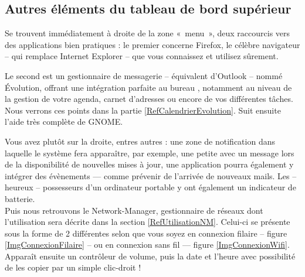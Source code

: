 \subsection{Autres éléments du tableau de bord supérieur}
\IconeBarreHaut
Se trouvent immédiatement à droite de la zone «~menu~», deux raccourcis vers des applications bien pratiques : le premier concerne Firefox, le célèbre navigateur  -- qui remplace Internet Explorer -- que vous connaissez et utilisez sûrement.\par
Le second est un gestionnaire de messagerie -- équivalent d'Outlook -- nommé Évolution, offrant une intégration parfaite au bureau , notamment au niveau de la gestion de votre agenda, carnet d'adresses ou encore de vos différentes tâches. Nous verrons ces points dans la partie \ref{RefCalendrierEvolution}. Suit ensuite l'aide très complète de GNOME.\par
Vous avez plutôt sur la droite, entres autres : une zone de notification dans laquelle le système fera apparaître, par exemple, une petite  avec un message lors de la disponibilité de nouvelles mises à jour, une application pourra également y intégrer des évènements --- comme prévenir de l'arrivée de nouveaux mails. Les -- heureux -- possesseurs d'un ordinateur portable y ont également un indicateur de batterie.\\
Puis nous retrouvons le Network-Manager, gestionnaire de réseaux dont l'utilisation sera décrite dans la section \ref{RefUtilisationNM}. Celui-ci se présente sous la forme de 2  différentes selon que vous soyez en connexion filaire -- figure \ref{ImgConnexionFilaire} -- ou en connexion sans fil --- figure \ref{ImgConnexionWifi}.\\
Apparaît ensuite un contrôleur de volume, puis la date et l'heure avec possibilité de les copier par un simple clic-droit !
